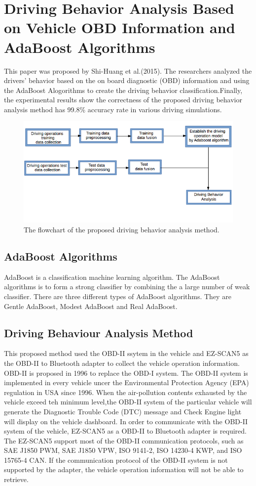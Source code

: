 \section{Driving Behavior Analysis Based on Vehicle OBD Information and AdaBoost Algorithms}
This paper was proposed by Shi-Huang et al.(2015). The researchers analyzed the drivers' behavior based on the on board diagnostic (OBD) information and using the AdaBoost Alogorithms to create the driving  behavior classification.Finally, the experimental results show the correctness of the proposed driving behavior analysis method has 99.8\% accuracy rate in various driving simulations.

\begin{figure}[hbt!]\centering
\includegraphics[width=.75\textwidth]{image/adaboost_flowchart}
\caption{The flowchart of the proposed driving behavior analysis method.}
\end{figure}

\subsection{AdaBoost Algorithms}
AdaBoost is a classification machine learning algorithm. The AdaBoost algorithms is to form a strong classifier by combining the a large number of weak classifier. There are three different types of AdaBoost algorithms. They are Gentle AdaBoost, Modest AdaBoost and Real AdaBoost.

\subsection{Driving Behaviour Analysis Method}
This proposed method used the OBD-II ssytem in the vehicle and EZ-SCAN5 as the OBD-II to Bluetooth adapter to collect the vehicle operation information. OBD-II is proposed in 1996 to replace the OBD-I system. The OBD-II system is implemented in every vehicle uncer the Environmental Protection Agency (EPA) regulation in USA since 1996. When the air-pollution contents exhausted by the vehicle exceed teh minimum level,the OBD-II system of the particular vehicle will generate the Diagnostic Trouble Code (DTC) message and Check Engine light will display on the vehicle dashboard. In order to communicate with the OBD-II system of the vehicle, EZ-SCAN5 as a OBD-II to Bluetooth adapter is required. The EZ-SCAN5 support most of the OBD-II communication protocols, such as SAE J1850 PWM, SAE J1850 VPW, ISO 9141-2, ISO 14230-4 KWP, and ISO 15765-4 CAN. If the communication protocol of the OBD-II system is not supported by the adapter, the vehicle operation information will not be able to retrieve.

